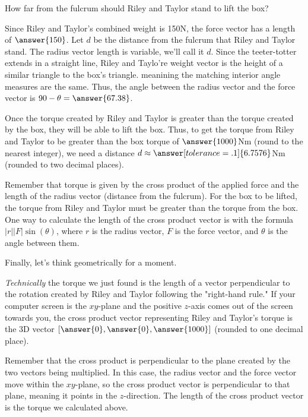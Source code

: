 \documentclass{ximera}
\begin{document}
\begin{problem}
    How far from the fulcrum should Riley and Taylor stand to lift the box?

    Since Riley and Taylor's combined weight is 150N, the force vector has a length of $\answer{150}$. Let $d$ be the distance from the fulcrum that Riley and Taylor stand. The radius vector length is variable, we'll call it $d$. Since the teeter-totter extends in a straight line, Riley and Taylo're weight vector is the height of a similar triangle to the box's triangle. meanining the matching interior angle measures are the same. Thus, the angle between the radius vector and the force vector is $90-\theta=\answer{67.38}$.

    Once the torque created by Riley and Taylor is greater than the torque created by the box, they will be able to lift the box. Thus, to get the torque from Riley and Taylor to be greater than the box torque of $\answer{1000}$Nm (round to the nearest integer), we need a distance $d\approx\answer[tolerance=.1]{6.7576}$Nm (rounded to two decimal places).
    \begin{feedback}
        Remember that torque is given by the cross product of the applied force and the length of the radius vector (distance from the fulcrum). For the box to be lifted, the torque from Riley and Taylor must be greater than the torque from the box. One way to calculate the length of the cross product vector is with the formula $|r||F|\sin(\theta)$, where $r$ is the radius vector, $F$ is the force vector, and $\theta$ is the angle between them.
    \end{feedback}
\end{problem}

Finally, let's think geometrically for a moment.

\begin{problem}
    \emph{Technically} the torque we just found is the length of a vector perpendicular to the rotation created by Riley and Taylor following the "right-hand rule." If your computer screen is the $xy$-plane and the positive $z$-axis comes out of the screen towards you, the cross product vector representing Riley and Taylor's torque is the 3D vector $[\answer{0},\answer{0},\answer{1000}]$ (rounded to one decimal place).

    \begin{feedback}
        Remember that the cross product is perpendicular to the plane created by the two vectors being multiplied. In this case, the radius vector and the force vector move within the $xy$-plane, so the cross product vector is perpendicular to that plane, meaning it points in the $z$-direction. The length of the cross product vector is the torque we calculated above.
    \end{feedback}
\end{problem}
\end{document}
